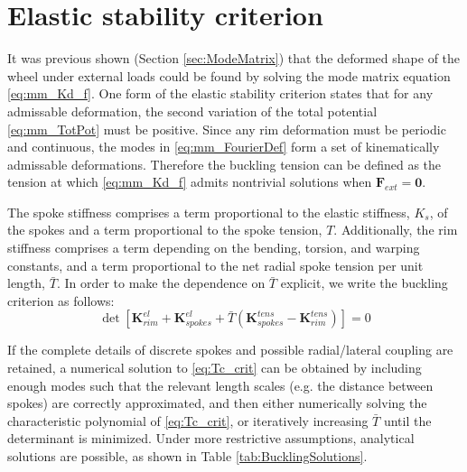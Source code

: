 \documentclass[\rootdir/thesis.tex]{subfiles}
\begin{document}
\section{Elastic stability criterion}
It was previous shown (Section \ref{sec:ModeMatrix}) that the deformed shape of the wheel under external loads could be found by solving the mode matrix equation \eqref{eq:mm_Kd_f}. One form of the elastic stability criterion states that for any admissable deformation, the second variation of the total potential \eqref{eq:mm_TotPot} must be positive. Since any rim deformation must be periodic and continuous, the modes in \eqref{eq:mm_FourierDef} form a set of kinematically admissable deformations. Therefore the buckling tension can be defined as the tension at which \eqref{eq:mm_Kd_f} admits nontrivial solutions when $\mathbf{F}_{ext}=\mathbf{0}.$

The spoke stiffness comprises a term proportional to the elastic stiffness, $K_s$, of the spokes and a term proportional to the spoke tension, $T$. Additionally, the rim stiffness comprises a term depending on the bending, torsion, and warping constants, and a term proportional to the net radial spoke tension per unit length, $\bar{T}$. In order to make the dependence on $\bar{T}$ explicit, we write the buckling criterion as follows:
\begin{equation}
\label{eq:Tc_crit}
\det{\left[\mathbf{K}_{rim}^{el} + \mathbf{K}_{spokes}^{el} + \bar{T}(\mathbf{K}_{spokes}^{tens} - \mathbf{K}_{rim}^{tens})\right]} = 0
\end{equation}

If the complete details of discrete spokes and possible radial/lateral coupling are retained, a numerical solution to \eqref{eq:Tc_crit} can be obtained by including enough modes such that the relevant length scales (e.g. the distance between spokes) are correctly approximated, and then either numerically solving the characteristic polynomial of \eqref{eq:Tc_crit}, or iteratively increasing $\bar{T}$ until the determinant is minimized. Under more restrictive assumptions, analytical solutions are possible, as shown in Table \ref{tab:BucklingSolutions}.
\end{document}
